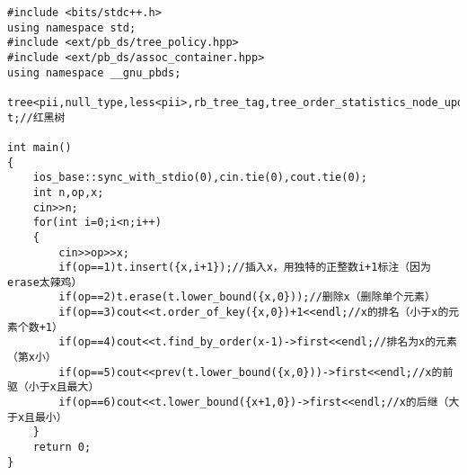 \begin{lstlisting}
#include <bits/stdc++.h>
using namespace std;
#include <ext/pb_ds/tree_policy.hpp>
#include <ext/pb_ds/assoc_container.hpp>
using namespace __gnu_pbds;

tree<pii,null_type,less<pii>,rb_tree_tag,tree_order_statistics_node_update> t;//红黑树

int main()
{
	ios_base::sync_with_stdio(0),cin.tie(0),cout.tie(0);
	int n,op,x;
	cin>>n;
	for(int i=0;i<n;i++)
	{
		cin>>op>>x;
		if(op==1)t.insert({x,i+1});//插入x，用独特的正整数i+1标注（因为erase太辣鸡）
		if(op==2)t.erase(t.lower_bound({x,0}));//删除x（删除单个元素）
		if(op==3)cout<<t.order_of_key({x,0})+1<<endl;//x的排名（小于x的元素个数+1）
		if(op==4)cout<<t.find_by_order(x-1)->first<<endl;//排名为x的元素（第x小）
		if(op==5)cout<<prev(t.lower_bound({x,0}))->first<<endl;//x的前驱（小于x且最大）
		if(op==6)cout<<t.lower_bound({x+1,0})->first<<endl;//x的后继（大于x且最小）
	}
	return 0;
}
\end{lstlisting}